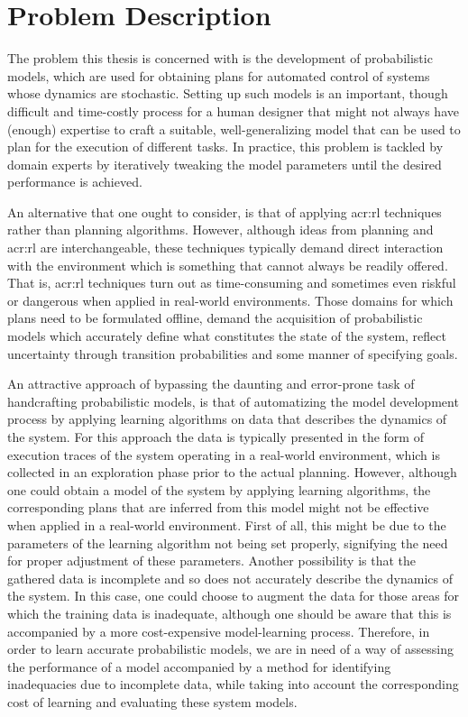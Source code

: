 \section{Problem Description}
\label{sec:problem-description}

The problem this thesis is concerned with is the development of probabilistic models, which are used for obtaining plans for automated control of systems whose dynamics are stochastic.
Setting up such models is an important, though difficult and time-costly process for a human designer that might not always have (enough) expertise to craft a suitable, well-generalizing model that can be used to plan for the execution of different tasks.
In practice, this problem is tackled by domain experts by iteratively tweaking the model parameters until the desired performance is achieved.

An alternative that one ought to consider, is that of applying \acrshort{acr:rl} techniques rather than planning algorithms.
However, although ideas from planning and \acrshort{acr:rl} are interchangeable, these techniques typically demand direct interaction with the environment which is something that cannot always be readily offered.
That is, \acrshort{acr:rl} techniques turn out as time-consuming and sometimes even riskful or dangerous when applied in real-world environments.
Those domains for which plans need to be formulated offline, demand the acquisition of probabilistic models which accurately define what constitutes the state of the system, reflect uncertainty through transition probabilities and some manner of specifying goals.%

An attractive approach of bypassing the daunting and error-prone task of handcrafting probabilistic models, is that of automatizing the model development process by applying learning algorithms on data that describes the dynamics of the system.
For this approach the data is typically presented in the form of execution traces of the system operating in a real-world environment, which is collected in an exploration phase prior to the actual planning.
However, although one could obtain a model of the system by applying learning algorithms, the corresponding plans that are inferred from this model might not be effective when applied in a real-world environment.
First of all, this might be due to the parameters of the learning algorithm not being set properly, signifying the need for proper adjustment of these parameters.
Another possibility is that the gathered data is incomplete and so does not accurately describe the dynamics of the system.
In this case, one could choose to augment the data for those areas for which the training data is inadequate, although one should be aware that this is accompanied by a more cost-expensive model-learning process.
Therefore, in order to learn accurate probabilistic models, we are in need of a way of assessing the performance of a model accompanied by a method for identifying inadequacies due to incomplete data, while taking into account the corresponding cost of learning and evaluating these system models.

